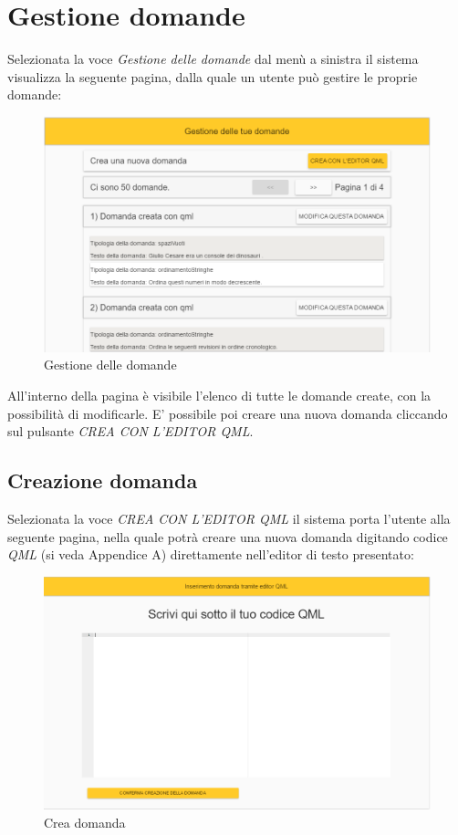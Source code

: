 \newpage
\section{Gestione domande}
Selezionata la voce \textit{Gestione delle domande} dal menù a sinistra il sistema visualizza la seguente pagina, dalla quale un utente può gestire le proprie domande:

\label{GestioneDomande}
\begin{figure}[ht]
	\centering
	\includegraphics[scale=0.50]{img/gestione_domande.png}
	\caption{Gestione delle domande}
\end{figure}
\FloatBarrier

All'interno della pagina è visibile l'elenco di tutte le domande create, con la possibilità di modificarle. E' possibile poi creare una nuova domanda cliccando sul pulsante \textit{CREA CON L'EDITOR QML}.

\newpage
\subsection{Creazione domanda}
Selezionata la voce \textit{CREA CON L'EDITOR QML} il sistema porta l'utente alla seguente pagina, nella quale potrà creare una nuova domanda digitando codice \textit{QML} (si veda Appendice A) direttamente nell'editor di testo presentato:

\label{CreaDomandaQML}
\begin{figure}[ht]
	\centering
	\includegraphics[scale=0.45]{img/creazione_domanda.png}
	\caption{Crea domanda}
\end{figure}
\FloatBarrier

